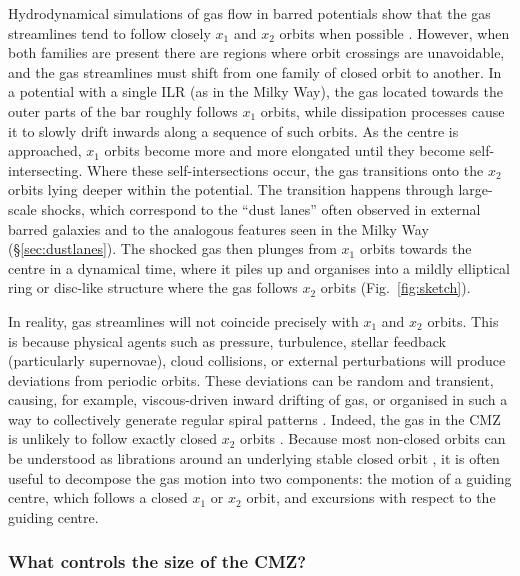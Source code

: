 Hydrodynamical simulations of gas flow in barred potentials show that the gas streamlines tend to follow closely $x_1$ and $x_2$ orbits when possible \citep{Athanassoula1992b,Sormani2015c}. However, when both families are present there are regions where orbit crossings are unavoidable, and the gas streamlines must shift from one family of closed orbit to another. In a potential with a single ILR (as in the Milky Way), the gas located towards the outer parts of the bar roughly follows $x_1$ orbits, while dissipation processes cause it to slowly drift inwards along a sequence of such orbits. As the centre is approached, $x_1$ orbits become more and more elongated until they become self-intersecting. Where these self-intersections occur, the gas transitions onto the $x_2$ orbits lying deeper within the potential.
The transition happens through large-scale shocks, which correspond to the ``dust lanes'' often observed in external barred galaxies \citep{Athanassoula1992b} and to the analogous features seen in the Milky Way (\S\ref{sec:dustlanes}). The shocked gas then plunges from $x_1$ orbits towards the centre in a dynamical time, where it piles up and organises into a mildly elliptical ring or disc-like structure where the gas follows $x_2$ orbits (Fig.~\ref{fig:sketch}). 

In reality, gas streamlines will not coincide precisely with $x_1$ and $x_2$ orbits. This is because physical agents such as pressure, turbulence, stellar feedback (particularly supernovae), cloud collisions, or external perturbations will produce deviations from periodic orbits. These deviations can be random and transient, causing, for example, viscous-driven inward drifting of gas, or organised in such a way to collectively generate regular spiral patterns \citep{Sormani2015b}. Indeed, the gas in the CMZ is unlikely to follow exactly closed $x_2$ orbits \citep{Kruijssen2015,Tress2020}. Because most non-closed orbits can be understood as librations around an underlying stable closed orbit \citep{Binney2008}, it is often useful to decompose the gas motion into two components: the motion of a guiding centre, which follows a closed $x_1$ or $x_2$ orbit, and excursions with respect to the guiding centre.

\subsubsection{What controls the size of the CMZ?} \label{sec:insights}

